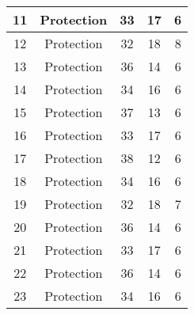 \documentclass[results.tex]{subfiles}
\begin{document}
\begin{center}
\begin{tabular}{| c || c | c | c | c |}
            \hline
            11                      & Protection                   & 33                     & 17                      & 6                    \\
            \hline
            12                      & Protection                   & 32                     & 18                      & 8                    \\
            \hline
            13                      & Protection                   & 36                     & 14                      & 6                    \\
            \hline
            14                      & Protection                   & 34                     & 16                      & 6                    \\
            \hline
            15                      & Protection                   & 37                     & 13                      & 6                    \\
            \hline
            16                      & Protection                   & 33                     & 17                      & 6                    \\
            \hline
            17                      & Protection                   & 38                     & 12                      & 6                    \\
            \hline
            18                      & Protection                   & 34                     & 16                      & 6                    \\
            \hline
            19                      & Protection                   & 32                     & 18                      & 7                    \\
            \hline
            20                      & Protection                   & 36                     & 14                      & 6                    \\
            \hline
            21                      & Protection                   & 33                     & 17                      & 6                    \\
            \hline
            22                      & Protection                   & 36                     & 14                      & 6                    \\
            \hline
            23                      & Protection                   & 34                     & 16                      & 6                    \\

\end{tabular}
\end{center}
\end{document}
